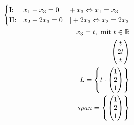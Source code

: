 \begin{align*}
    \begin{cases}
        \text{I:\@} & x_1 - x_3 = 0 \quad | + x_3 \Leftrightarrow x_1 = x_3 \\
        \text{II:\@} & x_2 - 2x_3 = 0 \quad | +2x_3 \Leftrightarrow x_2 = 2x_3
    \end{cases} \\
    x_3 = t, \text{ mit } t \in \mathbb{R} \\
    \begin{pmatrix}
        t \\ 2t \\ t
    \end{pmatrix} \\
    L = \left\{t \cdot \begin{pmatrix}
        1 \\ 2 \\ 1
    \end{pmatrix}\right\} \\
    span = \left\{\begin{pmatrix}
        1 \\ 2 \\ 1
    \end{pmatrix}\right\}
\end{align*}


